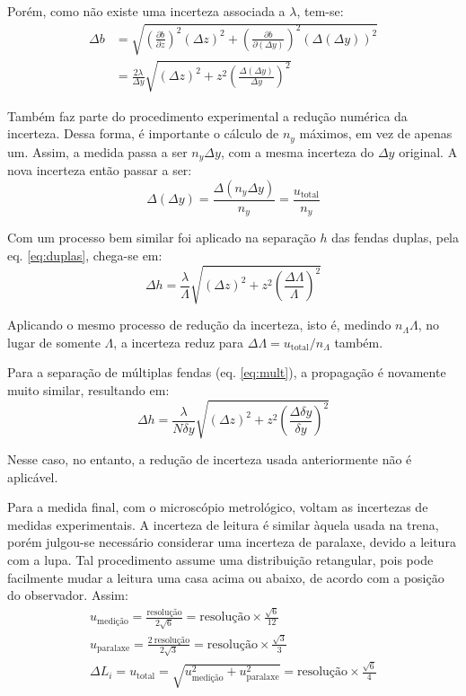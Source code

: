 Porém, como não existe uma incerteza associada a $\lambda$, tem-se:
\begin{align*}
    \Delta b
        &= \sqrt{\left(\frac{\partial b}{\partial z}\right)^2 (\Delta z)^2 + \left(\frac{\partial b}{\partial (\Delta y)}\right)^2 (\Delta (\Delta y))^2} \\
        &= \frac{2 \lambda}{\Delta y} \sqrt{(\Delta z)^2 + z^2 \left(\frac{\Delta (\Delta y)}{\Delta y}\right)^2}
\end{align*}

Também faz parte do procedimento experimental a redução numérica da incerteza. Dessa forma, é importante o cálculo de $n_y$ máximos, em vez de apenas um. Assim, a medida passa a ser $n_y \Delta y$, com a mesma incerteza do $\Delta y$ original. A nova incerteza então passar a ser:
\begin{equation*}
    \Delta (\Delta y) = \frac{\Delta (n_y \Delta y)}{n_y} = \frac{u_\text{total}}{n_y}
\end{equation*}

Com um processo bem similar foi aplicado na separação $h$ das fendas duplas, pela eq. \ref{eq:duplas}, chega-se em:
\begin{equation*}
    \Delta h = \frac{\lambda}{\Lambda} \sqrt{(\Delta z)^2 + z^2 \left(\frac{\Delta \Lambda}{\Lambda}\right)^2}
\end{equation*}

Aplicando o mesmo processo de redução da incerteza, isto é, medindo $n_\Lambda \Lambda$, no lugar de somente $\Lambda$, a incerteza reduz para $\Delta \Lambda = u_\text{total}/n_\Lambda$ também.

Para a separação de múltiplas fendas (eq. \ref{eq:mult}), a propagação é novamente muito similar, resultando em:
\begin{equation*}
    \Delta h = \frac{\lambda}{N \delta y} \sqrt{(\Delta z)^2 + z^2 \left(\frac{\Delta \delta y}{\delta y}\right)^2}
\end{equation*}

Nesse caso, no entanto, a redução de incerteza usada anteriormente não é aplicável.

Para a medida final, com o microscópio metrológico, voltam as incertezas de medidas experimentais. A incerteza de leitura é similar àquela usada na trena, porém julgou-se necessário considerar uma incerteza de paralaxe, devido a leitura com a lupa. Tal procedimento assume uma distribuição retangular, pois pode facilmente mudar a leitura uma casa acima ou abaixo, de acordo com a posição do observador. Assim:
\begin{gather*}
    u_{\text{medição}} = \frac{\text{resolução}}{2 \sqrt{6}} = \text{resolução} \times \frac{\sqrt{6}}{12} \\
    u_{\text{paralaxe}} = \frac{2\ \text{resolução}}{2 \sqrt{3}} = \text{resolução} \times \frac{\sqrt{3}}{3} \\
    \Delta L_i = u_{\text{total}}
        = \sqrt{u_{\text{medição}}^2 + u_{\text{paralaxe}}^2}
        = \text{resolução} \times \frac{\sqrt{6}}{4}
\end{gather*}

